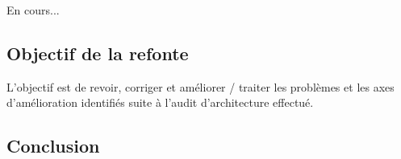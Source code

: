 En cours...
\subsection{Objectif de la refonte}
L'objectif est de revoir, corriger et améliorer / traiter les problèmes et les axes d'amélioration identifiés suite à l'audit d'architecture effectué.
\subsection*{Conclusion}


